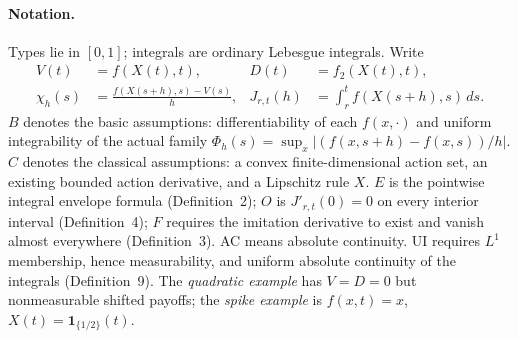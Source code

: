 \documentclass[11pt]{article}
\theoremstyle{remark}\newtheorem{remark}[theorem]{Remark}
\begin{document}
\paragraph{Notation.}
Types lie in $[0,1]$; integrals are ordinary Lebesgue integrals. Write
\[
 \begin{aligned}
 V(t)&=f(X(t),t),& D(t)&=f_2(X(t),t),\\
 \chi_h(s)&=\frac{f(X(s+h),s)-V(s)}{h},&
 J_{r,t}(h)&=\int_r^t f(X(s+h),s)\,ds.
 \end{aligned}
\]
$B$ denotes the basic assumptions: differentiability of each $f(x,\cdot)$
and uniform integrability of the actual family
$\Phi_h(s)=\sup_x|(f(x,s+h)-f(x,s))/h|$.
$C$ denotes the classical assumptions: a convex finite-dimensional action
set, an existing bounded action derivative, and a Lipschitz rule $X$.
$E$ is the pointwise integral envelope formula (Definition~2);
$O$ is $J'_{r,t}(0)=0$ on every interior interval (Definition~4);
$F$ requires the imitation derivative to exist and vanish almost everywhere
(Definition~3). AC means absolute continuity. UI requires $L^1$ membership,
hence measurability, and uniform absolute continuity of the integrals
(Definition~9).  The \emph{quadratic example} has $V=D=0$ but
nonmeasurable shifted payoffs; the \emph{spike example} is
$f(x,t)=x$, $X(t)=\mathbf 1_{\{1/2\}}(t)$.
\end{document}
